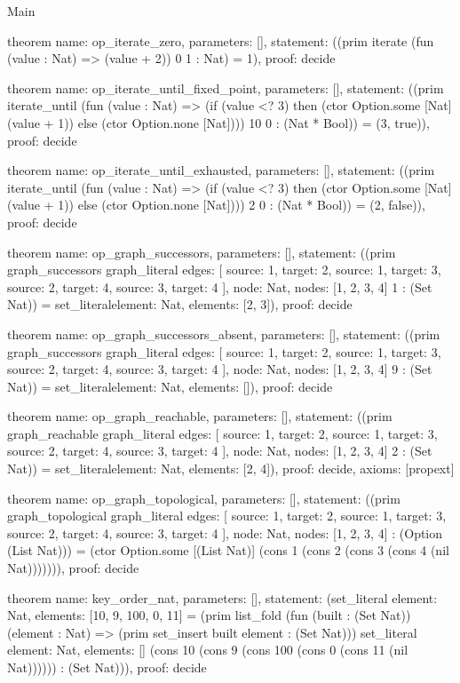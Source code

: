 \begin{lexlean}{Main}
\begin{semanticmodule}
theorem{
  name: op_iterate_zero,
  parameters: [],
  statement: ((prim iterate (fun (value : Nat) => (value + 2)) 0 1 : Nat) = 1),
  proof: decide{}
}

theorem{
  name: op_iterate_until_fixed_point,
  parameters: [],
  statement: ((prim iterate_until (fun (value : Nat) => (if (value <? 3) then (ctor Option.some [Nat] (value + 1)) else (ctor Option.none [Nat]))) 10 0 : (Nat * Bool)) = (3, true)),
  proof: decide{}
}

theorem{
  name: op_iterate_until_exhausted,
  parameters: [],
  statement: ((prim iterate_until (fun (value : Nat) => (if (value <? 3) then (ctor Option.some [Nat] (value + 1)) else (ctor Option.none [Nat]))) 2 0 : (Nat * Bool)) = (2, false)),
  proof: decide{}
}

theorem{
  name: op_graph_successors,
  parameters: [],
  statement: ((prim graph_successors graph_literal{
    edges: [
      {source: 1, target: 2},
      {source: 1, target: 3},
      {source: 2, target: 4},
      {source: 3, target: 4}
    ],
    node: Nat,
    nodes: [1, 2, 3, 4]
  } 1 : (Set Nat)) = set_literal{element: Nat, elements: [2, 3]}),
  proof: decide{}
}

theorem{
  name: op_graph_successors_absent,
  parameters: [],
  statement: ((prim graph_successors graph_literal{
    edges: [
      {source: 1, target: 2},
      {source: 1, target: 3},
      {source: 2, target: 4},
      {source: 3, target: 4}
    ],
    node: Nat,
    nodes: [1, 2, 3, 4]
  } 9 : (Set Nat)) = set_literal{element: Nat, elements: []}),
  proof: decide{}
}

theorem{
  name: op_graph_reachable,
  parameters: [],
  statement: ((prim graph_reachable graph_literal{
    edges: [
      {source: 1, target: 2},
      {source: 1, target: 3},
      {source: 2, target: 4},
      {source: 3, target: 4}
    ],
    node: Nat,
    nodes: [1, 2, 3, 4]
  } 2 : (Set Nat)) = set_literal{element: Nat, elements: [2, 4]}),
  proof: decide{},
  axioms: [propext]
}

theorem{
  name: op_graph_topological,
  parameters: [],
  statement: ((prim graph_topological graph_literal{
    edges: [
      {source: 1, target: 2},
      {source: 1, target: 3},
      {source: 2, target: 4},
      {source: 3, target: 4}
    ],
    node: Nat,
    nodes: [1, 2, 3, 4]
  } : (Option (List Nat))) = (ctor Option.some [(List Nat)] (cons 1 (cons 2 (cons 3 (cons 4 (nil Nat))))))),
  proof: decide{}
}

theorem{
  name: key_order_nat,
  parameters: [],
  statement: (set_literal{
    element: Nat,
    elements: [10, 9, 100, 0, 11]
  } = (prim list_fold (fun (built : (Set Nat)) (element : Nat) => (prim set_insert built element : (Set Nat))) set_literal{
    element: Nat,
    elements: []
  } (cons 10 (cons 9 (cons 100 (cons 0 (cons 11 (nil Nat)))))) : (Set Nat))),
  proof: decide{}
}


\end{semanticmodule}
\end{lexlean}
